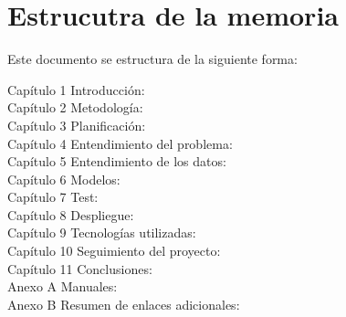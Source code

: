 \section{Estrucutra de la memoria}

Este documento se estructura de la siguiente forma:
\begin{description}
\item[Capítulo 1 Introducción:]
\item[Capítulo 2 Metodología:] 
\item[Capítulo 3 Planificación:]
\item[Capítulo 4 Entendimiento del problema:]
\item[Capítulo 5 Entendimiento de los datos:]
\item[Capítulo 6 Modelos:]
\item[Capítulo 7 Test:]
\item[Capítulo 8 Despliegue:]
\item[Capítulo 9 Tecnologías utilizadas:]
\item[Capítulo 10 Seguimiento del proyecto:]
\item[Capítulo 11 Conclusiones:]
\item[Anexo A Manuales:]
\item[Anexo B Resumen de enlaces adicionales:]
\end{description}
